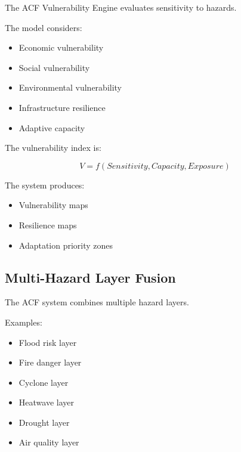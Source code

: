 The ACF Vulnerability Engine evaluates sensitivity to hazards.

The model considers:

\begin{itemize}

\item Economic vulnerability

\item Social vulnerability

\item Environmental vulnerability

\item Infrastructure resilience

\item Adaptive capacity

\end{itemize}


The vulnerability index is:

\[
V=
f(Sensitivity,Capacity,Exposure)
\]


The system produces:

\begin{itemize}

\item Vulnerability maps

\item Resilience maps

\item Adaptation priority zones

\end{itemize}



\subsection{Multi-Hazard Layer Fusion}

The ACF system combines multiple hazard layers.

Examples:

\begin{itemize}

\item Flood risk layer

\item Fire danger layer

\item Cyclone layer

\item Heatwave layer

\item Drought layer

\item Air quality layer

\end{itemize}


